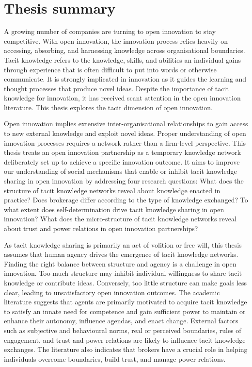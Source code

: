 \section{Thesis summary}

A growing number of companies are turning to open innovation to stay competitive. With open innovation, the innovation process relies heavily on accessing, absorbing, and harnessing knowledge across organisational boundaries. Tacit knowledge refers to the knowledge, skills, and abilities an individual gains through experience that is often difficult to put into words or otherwise communicate. It is strongly implicated in innovation as it guides the learning and thought processes that produce novel ideas. Despite the importance of tacit knowledge for innovation, it has received scant attention in the open innovation literature. This thesis explores the tacit dimension of open innovation. \medskip

Open innovation implies extensive inter-organisational relationships to gain access to new external knowledge and exploit novel ideas. Proper understanding of open innovation processes requires a network rather than a firm-level perspective. This thesis treats an open innovation partnership as a temporary knowledge network deliberately set up to achieve a specific innovation outcome. It aims to improve our understanding of social mechanisms that enable or inhibit tacit knowledge sharing in open innovation by addressing four research questions: What does the structure of tacit knowledge networks reveal about knowledge enacted in practice? Does brokerage differ according to the type of knowledge exchanged? To what extent does self-determination drive tacit knowledge sharing in open innovation? What does the micro-structure of tacit knowledge networks reveal about trust and power relations in open innovation partnerships? \medskip

As tacit knowledge sharing is primarily an act of volition or free will, this thesis assumes that human agency drives the emergence of tacit knowledge networks. Finding the right balance between structure and agency is a challenge in open innovation. Too much structure may inhibit individual willingness to share tacit knowledge or contribute ideas. Conversely, too little structure can make goals less clear, leading to unsatisfactory open innovation outcomes. The academic literature suggests that agents are primarily motivated to acquire tacit knowledge to satisfy an innate need for competence and gain sufficient power to maintain or enhance their autonomy, influence agendas, and enact change. External factors such as subjective and behavioural norms, real or perceived boundaries, rules of engagement, and trust and power relations are likely to influence tacit knowledge exchanges. The literature also indicates that brokers have a crucial role in helping individuals overcome boundaries, build trust, and manage power relations. \medskip

